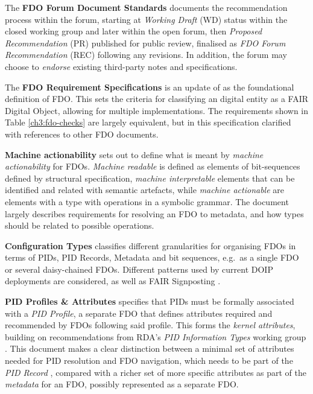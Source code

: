 The \textbf{FDO Forum Document Standards} \cite{fdo-DocProcessStd} documents the recommendation process within the forum, starting at \emph{Working Draft} (WD) status within the closed working group and later within the open forum, then \emph{Proposed Recommendation} (PR) published for public review, finalised as \emph{FDO Forum Recommendation} (REC) following any revisions. In addition, the forum may choose to \emph{endorse} existing third-party notes and specifications.

The \textbf{FDO Requirement Specifications} \cite{fdo-RequirementSpec} is an update of \cite{bonino2019} as the foundational definition of FDO. This sets the criteria for classifying an digital entity as a FAIR Digital Object, allowing for multiple implementations. The requirements shown in Table \vref{ch3:fdo-checks} are largely equivalent, but in this specification clarified with references to other FDO documents.

\textbf{Machine actionability}\label{def:machineactionable} \cite{fdo-MachineActionDef} sets out to define what is meant by \emph{machine actionability} for FDOs. \emph{Machine readable} is defined as elements of bit-sequences defined by structural specification, \emph{machine interpretable} elements that can be identified and related with semantic artefacts, while \emph{machine actionable} are elements with a type with operations in a symbolic grammar. The document largely describes requirements for resolving an FDO to metadata, and how types should be related to possible operations.

\textbf{Configuration Types} \cite{fdo-ConfigurationTypes} classifies different granularities for organising FDOs in terms of PIDs, PID Records, Metadata and bit sequences, e.g.~as a single FDO or several daisy-chained FDOs. Different patterns used by current DOIP deployments are considered, as well as FAIR Signposting \cite{vandesompel2015,Van de Sompel 2022}.

\textbf{PID Profiles \& Attributes} \cite{fdo-PIDProfileAttributes} specifies that PIDs must be formally associated with a \emph{PID Profile}, a separate FDO that defines attributes required and recommended by FDOs following said profile. This forms the \emph{kernel attributes}, building on recommendations from RDA's \emph{PID Information Types} working group \cite{weigelRDARecommendationPID2018}. This document makes a clear distinction between a minimal set of attributes needed for PID resolution and FDO navigation, which needs to be part of the \emph{PID Record} \cite{islam_2023}, compared with a richer set of more specific attributes as part of the \emph{metadata} for an FDO, possibly represented as a separate FDO.

